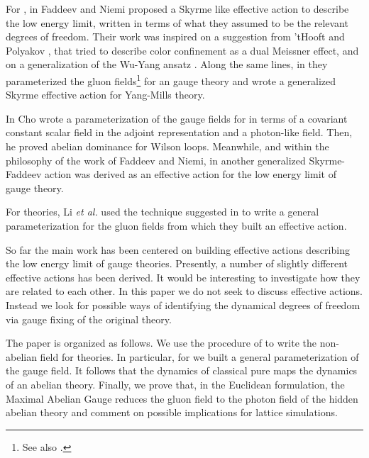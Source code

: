 \documentclass[a4paper,a4paper]{article}
\begin{document}
For \coordHE{}, in \cite{FaNi98} Faddeev and Niemi proposed a Skyrme like 
effective action to describe the low energy limit, written in terms of what 
they assumed to be the relevant degrees of freedom. 
Their work was inspired on a suggestion from 'tHooft and Polyakov 
\cite{tHPo,Poly}, 
that tried to describe color confinement as a dual Meissner effect, and on a 
generalization of the Wu-Yang ansatz \cite{WuYa}. Along the same lines,
in \cite{FaNi98a} they parameterized the gluon 
fields\footnote{See also \cite{FaNi99}.} for an \coordHE{} gauge theory and wrote
a generalized Skyrme effective action for \coordHE{} Yang-Mills theory. 

In \cite{Cho99,Cho80} Cho wrote a parameterization of the 
gauge fields for \coordHE{} in terms of a covariant constant scalar field in the 
adjoint representation and a photon-like field. Then, he proved 
abelian dominance for Wilson loops.
Meanwhile, and within the philosophy of the work of Faddeev and Niemi, 
in \cite{ChoLeePak} another generalized Skyrme-Faddeev action was derived as 
an effective action for the low energy limit of \coordHE{} gauge theory.

For \coordHE{} theories, Li \textit{et al.} \cite{Li99} used the technique
suggested in \cite{Cho99} to write a general parameterization for the gluon 
fields from which they built an effective action.

So far the main work has been centered on building effective actions 
describing the low energy limit of \coordHE{} gauge theories. Presently, a
number of slightly different effective actions has been derived. It would
be interesting to investigate how they are related to each other. In this 
paper we do not seek to discuss effective actions. Instead we 
look for possible ways of identifying the dynamical degrees of freedom via 
gauge fixing of the original theory.

The paper is organized as follows. We use the procedure of
\cite{Cho99} to write the non-abelian field \coordHE{} for \coordHE{} theories. 
In particular, for \coordHE{} we built a general parameterization of the gauge 
field. It follows that the dynamics of classical pure \coordHE{} maps the
dynamics of an abelian theory. Finally, we prove that, in the Euclidean 
formulation, the Maximal Abelian Gauge reduces the gluon field \coordHE{} to
the photon field of the hidden abelian theory and comment on possible 
implications for lattice simulations.
\end{document}
